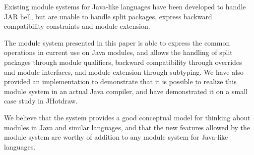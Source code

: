 Existing module systems for Java-like languages have been developed
to handle JAR hell, but are unable to handle split packages,
express backward compatibility constraints and module extension.

The module system presented in this paper is able to express the common operations
in current use on Java modules, and allows the handling of split packages through
module qualifiers, backward compatibility through overrides and module interfaces,
and module extension through subtyping. We have
also provided an implementation to demonstrate that it is
possible to realize this module system in an actual Java compiler,
and have demonstrated it on a small case study in JHotdraw.

We believe that the system provides a good conceptual
model for thinking about modules in Java and similar languages,
and that the new features allowed by the module system are worthy
of addition to any module system for Java-like languages.
